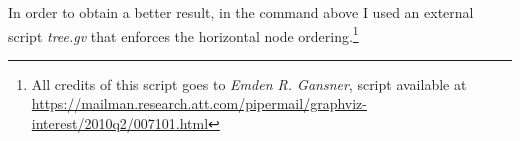 \documentclass[a4paper]{article}
\begin{document}
In order to obtain a better result, in the command above I used an external script \emph{tree.gv} that enforces the horizontal node ordering.\footnote{All credits of this script goes to \emph{Emden R. Gansner}, script available at \url{https://mailman.research.att.com/pipermail/graphviz-interest/2010q2/007101.html}}
\end{document}
